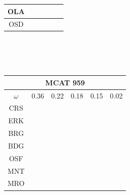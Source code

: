 \documentclass[12pt]{article}
\begin{document}
\begin{landscape}
\begin{figure}
{\begin{minipage}[c]{0.3\textwidth}
\begin{tabular}{|c|c|c|c|c|c|}
        OLA&\cellcolor[HTML]{984EA3}&\cellcolor[HTML]{FF7F00}&\cellcolor[HTML]{984EA3}&\cellcolor[HTML]{FF7F00}&\cellcolor[HTML]{984EA3}\\ \hline %
        OSD&\cellcolor[HTML]{984EA3}&\cellcolor[HTML]{FF7F00}&\cellcolor[HTML]{984EA3}&\cellcolor[HTML]{FF7F00}&\cellcolor[HTML]{984EA3}\\ \hline %
\end{tabular}\\$~$\\$~$\\
\begin{tabular}{|c|c|c|c|c|c|}%
         \hline \multicolumn{6}{|c|}{MCAT 959} \\ \hline
         $\omega$&0.36&0.22&0.18&0.15&0.02\\ \hline %
        CRS&\cellcolor[HTML]{E41A1C}&\cellcolor[HTML]{E41A1C}&\cellcolor[HTML]{E41A1C}&\cellcolor[HTML]{E41A1C}&\cellcolor[HTML]{E41A1C}\\ \hline %
        ERK&\cellcolor[HTML]{377EB8}&\cellcolor[HTML]{E41A1C}&\cellcolor[HTML]{377EB8}&\cellcolor[HTML]{E41A1C}&\cellcolor[HTML]{E41A1C}\\ \hline %
        BRG&\cellcolor[HTML]{4DAF4A}&\cellcolor[HTML]{E41A1C}&\cellcolor[HTML]{377EB8}&\cellcolor[HTML]{377EB8}&\cellcolor[HTML]{377EB8}\\ \hline %
        BDG&\cellcolor[HTML]{984EA3}&\cellcolor[HTML]{377EB8}&\cellcolor[HTML]{4DAF4A}&\cellcolor[HTML]{4DAF4A}&\cellcolor[HTML]{377EB8}\\ \hline %
        OSF&\cellcolor[HTML]{984EA3}&\cellcolor[HTML]{377EB8}&\cellcolor[HTML]{4DAF4A}&\cellcolor[HTML]{4DAF4A}&\cellcolor[HTML]{4DAF4A}\\ \hline %
        MNT&\cellcolor[HTML]{984EA3}&\cellcolor[HTML]{377EB8}&\cellcolor[HTML]{4DAF4A}&\cellcolor[HTML]{4DAF4A}&\cellcolor[HTML]{4DAF4A}\\ \hline %
        MRO&\cellcolor[HTML]{FF7F00}&\cellcolor[HTML]{4DAF4A}&\cellcolor[HTML]{984EA3}&\cellcolor[HTML]{984EA3}&\cellcolor[HTML]{4DAF4A}\\ \hline %

\end{tabular}
\end{minipage}}
\end{figure}
\end{landscape}
\end{document}
